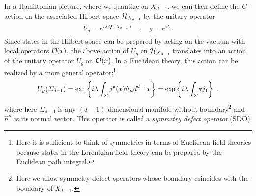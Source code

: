 \documentclass[11pt]{article}
\newcommand{\eq}[1]{\begin{align}\begin{split}#1\end{split}\end{align}}
\def\exp{{\rm exp}}
\def\CH {{\cal H}}
\def\CO {{\cal O}}
\def\CO {{\cal O}}
\def\CH {{\cal H}}
\begin{document}
In a Hamiltonian picture, where we quantize on $X_{d-1}$, we can then define the $G$-action on the associated Hilbert space $\CH_{X_{d-1}}$ by the unitary operator
\eq{\label{Hilb0form}
U_g=e^{i \lambda\, Q(X_{d-1})}\quad, \quad g=e^{i \lambda}~. 
}
Since states in the Hilbert space can be prepared by acting on the vacuum with local operators $\CO(x)$, the above action of $U_g$ on $\CH_{X_{d-1}}$ translates into an action of the unitary operator $U_g$ on $\CO(x)$. In a Euclidean theory, this action can be realized by a more general operator:\footnote{Here it is sufficient to think of symmetries in terms of Euclidean field theories because states in the Lorentzian field theory can be prepared by the Euclidean path integral. }
\eq{
U_g(\Sigma_{d-1})=\exp\left\{i \lambda \int_{\Sigma} j^\mu(x) \hat{n}_\mu d^{d-1}x\right\} = \exp\left\{i \lambda \int_{\Sigma} \ast j_1\right\}~,
}
where here $\Sigma_{d-1}$ is any $(d-1)$-dimensional manifold without boundary\footnote{Here we allow   symmetry defect operators whose boundary coincides with the boundary of $X_{d-1}$.} and $\hat{n}^\mu$ is its normal vector. This operator is called a \emph{symmetry defect operator} (SDO).  
\end{document}
